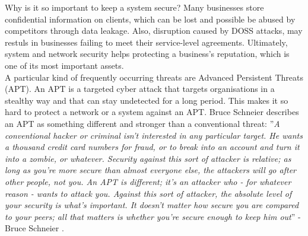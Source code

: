 \documentclass[journal,a4paper]{IEEEtran}
\begin{document}
Why is it so important to keep a system secure?  Many businesses store confidential information on clients, which can be lost and possible be abused by competitors through data leakage. Also, disruption caused by DOSS attacks, may restuls in businesses failing to meet their service-level agreements. Ultimately, system and network security helps protecting a business's reputation, which is one of its most important assets. \\
 

A particular kind of frequently occurring threats are Advanced Persistent Threats (APT). An APT is a targeted cyber attack that targets organisations in a stealthy way and that can stay undetected for a long period. This makes it so hard to protect a network or a system against an APT. Bruce Schneier describes an APT as something different and stronger than a conventional threat: ''\textit{A conventional hacker or criminal isn't interested in any particular target. He wants a thousand credit card numbers for fraud, or to break into an account and turn it into a zombie, or whatever. Security against this sort of attacker is relative; as long as you're more secure than almost everyone else, the attackers will go after other people, not you. An APT is different; it's an attacker who - for whatever reason - wants to attack you. Against this sort of attacker, the absolute level of your security is what's important. It doesn't matter how secure you are compared to your peers; all that matters is whether you're secure enough to keep him out}'' - Bruce Schneier \cite{APTBruce}.\\
\end{document}
